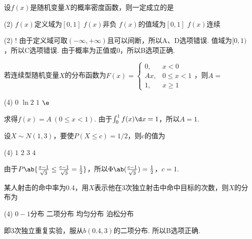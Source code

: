 \begin{problem}
    设$f(x)$是随机变量$X$的概率密度函数，则一定成立的是
    \begin{tasks}(2)
        \task $f(x)$定义域为$[0,1]$
        \task[\true] $f(x)$非负
        \task $f(x)$的值域为$[0,1]$
        \task $f(x)$连续
    \end{tasks}
\end{problem}
\begin{solution}\leavevmode
    \begin{tasks}[label=\labelitemi](2)
        \task! 由于定义域可取$(-\infty,+\infty)$且可以间断，所以A、D选项错误.
        \task 值域为$[0,1)$，所以C选项错误.
        \task 由于概率为正值或$0$，所以B选项正确.
    \end{tasks}
\end{solution}

\begin{problem}
    若连续型随机变量$X$的分布函数为$F(x)=\begin{cases}
        0, & x<0\\
        Ax, & 0\leq x<1\\
        1, & x\geq 1
    \end{cases}$，则$A=$
    \begin{tasks}(4)
        \task $0$
        \task $\ln2$
        \task[\true] $1$
        \task $\e$
    \end{tasks}
\end{problem}
\begin{solution}
    求得$f(x)=A\ (0\leq x<1)$. 由于$\int_0^1f(x)\d x=1$，所以$A=1$.
\end{solution}

\begin{problem}
    设$X\sim N(1,3)$，要使$P(X\leq c)=1/2$，则$c$的值为
    \begin{tasks}(4)
        \task[\true] $1$
        \task $2$
        \task $3$
        \task $4$
    \end{tasks}
\end{problem}
\begin{solution}
    由于$P\ab\{\frac{x-1}{\sqrt3}\leq\frac{c-1}{\sqrt3}=\frac12\}$，所以$\Phi\ab(\frac{c-1}{\sqrt3})=\frac12$，$c=1$.
\end{solution}

\begin{problem}
    某人射击的命中率为$0.4$，用$X$表示他在3次独立射击中命中目标的次数，则$X$的分布为
    \begin{tasks}(4)
        \task $0-1$分布
        \task[\true] 二项分布
        \task 均匀分布
        \task 泊松分布
    \end{tasks}
\end{problem}
\begin{solution}
    即3次独立重复实验，服从$b(0.4,3)$的二项分布. 所以B选项正确.
\end{solution}

